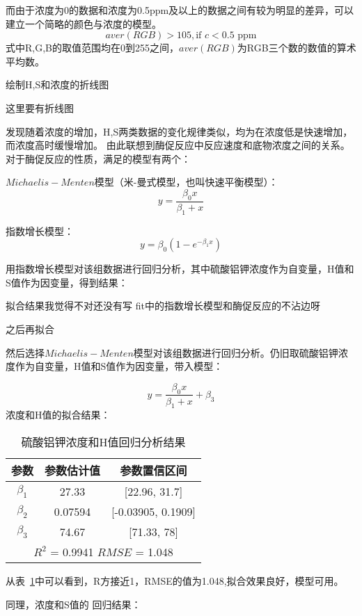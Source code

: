     而由于浓度为0的数据和浓度为0.5ppm及以上的数据之间有较为明显的差异，可以建立一个简略的颜色与浓度的模型。
    $$aver(RGB)>105, \text{if } c<0.5 \text{ ppm} $$
    式中R,G,B的取值范围均在0到255之间，$aver(RGB)$为RGB三个数的数值的算术平均数。
    
    绘制H,S和浓度的折线图

    这里要有折线图
    
    发现随着浓度的增加，H,S两类数据的变化规律类似，均为在浓度低是快速增加，而浓度高时缓慢增加。
    由此联想到酶促反应中反应速度和底物浓度之间的关系。对于酶促反应的性质，满足的模型有两个：
    
    $Michaelis-Menten$模型（米-曼式模型，也叫快速平衡模型）：
    $$y=\frac{\beta_0x}{\beta_1+x}$$
    
    指数增长模型：$$y=\beta_0(1-e^{-\beta_1x})$$
    
    用指数增长模型对该组数据进行回归分析，其中硫酸铝钾浓度作为自变量，H值和S值作为因变量，得到结果：
    
    拟合结果我觉得不对还没有写  fit中的指数增长模型和酶促反应的不沾边呀
    
    之后再拟合
    
    然后选择$Michaelis-Menten$模型对该组数据进行回归分析。仍旧取硫酸铝钾浓度作为自变量，H值和S值作为因变量，带入模型：
    
    $$y=\frac{\beta_0x}{\beta_1+x}+\beta_3$$
    浓度和H值的拟合结果：
    \begin{table}[H]
      \centering
      \caption{硫酸铝钾浓度和H值回归分析结果}
      \label{硫酸铝钾浓度和H值}
      \begin{tabular}{@{}ccc@{}}
      \toprule
      参数        & 参数估计值      & 参数置信区间                   \\ \midrule
      $\beta_1$     & 27.33     & {[}22.96, 31.7{]}     \\
      $\beta_2$     & 0.07594   & {[}-0.03905, 0.1909{]}    \\
      $\beta_3$     & 74.67     & {[}71.33, 78{]}         \\
      \hline
      \multicolumn{3}{c}{$R^2$ = 0.9941   $RMSE$ = 1.048} \\ \bottomrule
      \end{tabular}
    \end{table}
    
    从表~\ref{硫酸铝钾浓度和H值}中可以看到，R方接近1，RMSE的值为1.048,拟合效果良好，模型可用。
    
    同理，浓度和S值的
    回归结果：
    
